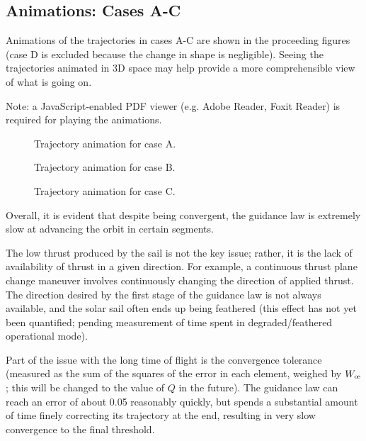\subsection{Animations: Cases A-C}
Animations of the trajectories in cases A-C are shown in the proceeding figures (case D is excluded because the change in shape is negligible). Seeing the trajectories animated in 3D space may help provide a more comprehensible view of what is going on.

Note: a JavaScript-enabled PDF viewer (e.g. Adobe Reader, Foxit Reader) is required for playing the animations.

\begin{figure}[H]
    \caption{Trajectory animation for case A.}
    \label{fig:anim_a}
\end{figure}
\begin{figure}[H]
    \caption{Trajectory animation for case B.}
    \label{fig:anim_b}
\end{figure}
\begin{figure}[H]
    \caption{Trajectory animation for case C.}
    \label{fig:anim_c}
\end{figure}

Overall, it is evident that despite being convergent, the guidance law is extremely slow at advancing the orbit in certain segments.

The low thrust produced by the sail is not the key issue; rather, it is the lack of availability of thrust in a given direction. For example, a continuous thrust plane change maneuver involves continuously changing the direction of applied thrust. The direction desired by the first stage of the guidance law is not always available, and the solar sail often ends up being feathered (this effect has not yet been quantified; pending measurement of time spent in degraded/feathered operational mode).

Part of the issue with the long time of flight is the convergence tolerance (measured as the sum of the squares of the error in each element, weighed by \(W_{\moe}\); this will be changed to the value of \(Q\) in the future). The guidance law can reach an error of about 0.05 reasonably quickly, but spends a substantial amount of time finely correcting its trajectory at the end, resulting in very slow convergence to the final threshold.

